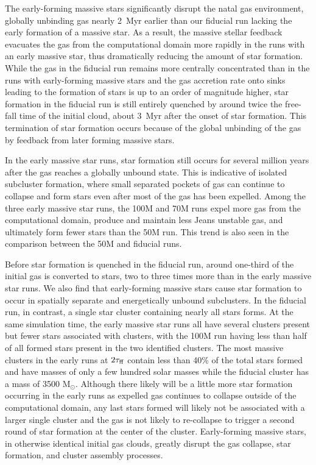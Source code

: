 \documentclass[twoside]{drexel-thesis}
\begin{document}
\begin{thesis}
The early-forming massive stars significantly disrupt the natal gas environment, globally unbinding gas nearly 2~Myr earlier than our fiducial run lacking the early formation of a massive star.
As a result, the massive stellar feedback evacuates the gas from the computational domain more rapidly in the runs with an early massive star, thus dramatically reducing the amount of star formation. While the gas in the fiducial run remains more centrally concentrated than in the runs with early-forming massive stars and the gas accretion rate onto sinks leading to the formation of stars is up to an order of magnitude higher, star formation in the fiducial run is still entirely quenched by around twice the free-fall time of the initial cloud, about 3~Myr after the onset of star formation. This termination of star formation occurs because of the global unbinding of the gas by feedback from later forming massive stars. 

In the early massive star runs, star formation still occurs for several million years after the gas reaches a globally unbound state. This is indicative of isolated subcluster formation, where small separated pockets of gas can continue to collapse and form stars even after most of the gas has been expelled. Among the three early massive star runs, the 100M and 70M runs expel more gas from the computational domain, produce and maintain less Jeans unstable gas, and ultimately form fewer stars than the 50M run. This trend is also seen in the comparison between the 50M and fiducial runs.

Before star formation is quenched in the fiducial run, around one-third of the initial gas is converted to stars, two to three times more than in the early massive star runs. We also find that early-forming massive stars cause star formation to occur in spatially separate and energetically unbound subclusters. In the fiducial run, in contrast, a single star cluster containing nearly all stars forms. At the same simulation time, the early massive star runs all have several clusters present but fewer stars associated with clusters, with the 100M run having less than half of all formed stars present in the two identified clusters. The most massive clusters in the early runs at $2\tau_{\rm ff}$ contain less than 40\% of the total stars formed and have masses of only a few hundred solar masses while the fiducial cluster has a mass of 3500 M$_\odot$. Although there likely will be a little more star formation occurring in the early runs as expelled gas continues to collapse outside of the computational domain, any last stars formed will likely not be associated with a larger single cluster and the gas is not likely to re-collapse to trigger a second round of star formation at the center of the cluster. 
Early-forming massive stars, in otherwise identical initial gas clouds, greatly disrupt the gas collapse, star formation, and cluster assembly processes.


\end{thesis}
\end{document}
